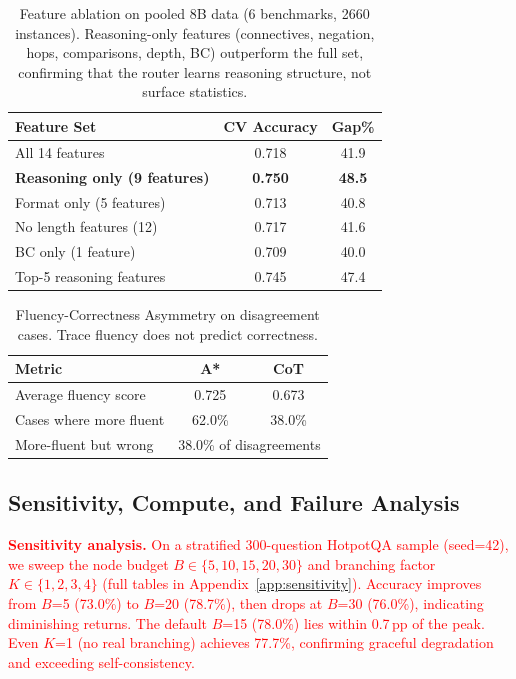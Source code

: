 \documentclass[11pt]{article}
\begin{document}
{\begin{table}[ht]
\centering
\small
\begin{tabular}{lcc}
\toprule
\textbf{Feature Set} & \textbf{CV Accuracy} & \textbf{Gap\%} \\
\midrule
All 14 features & 0.718 & 41.9 \\
\textbf{Reasoning only (9 features)} & \textbf{0.750} & \textbf{48.5} \\
Format only (5 features) & 0.713 & 40.8 \\
No length features (12) & 0.717 & 41.6 \\
BC only (1 feature) & 0.709 & 40.0 \\
Top-5 reasoning features & 0.745 & 47.4 \\
\bottomrule
\end{tabular}
\caption{Feature ablation on pooled 8B data (6 benchmarks, 2660 instances). Reasoning-only features (connectives, negation, hops, comparisons, depth, BC) outperform the full set, confirming that the router learns reasoning structure, not surface statistics.}
\label{tab:feature_ablation}
\end{table}

\begin{table}[t]
\centering
\small
\begin{tabular}{lcc}
\toprule
\textbf{Metric} & \textbf{A*} & \textbf{CoT} \\
\midrule
Average fluency score & 0.725 & 0.673 \\
Cases where more fluent & 62.0\% & 38.0\% \\
More-fluent but wrong & \multicolumn{2}{c}{38.0\% of disagreements} \\
\bottomrule
\end{tabular}
\caption{Fluency-Correctness Asymmetry on disagreement cases. Trace fluency does not predict correctness.}
\label{tab:fluency_asymmetry}
\end{table}

\subsection{Sensitivity, Compute, and Failure Analysis}
\label{sec:sensitivity}

\textcolor{red}{\textbf{Sensitivity analysis.}}
\textcolor{red}{On a stratified 300-question HotpotQA sample (seed=42), we sweep the node budget $B \in \{5,10,15,20,30\}$ and branching factor $K \in \{1,2,3,4\}$ (full tables in Appendix~\ref{app:sensitivity}). Accuracy improves from $B$=5 (73.0\%) to $B$=20 (78.7\%), then drops at $B$=30 (76.0\%), indicating diminishing returns. The default $B$=15 (78.0\%) lies within 0.7\,pp of the peak. Even $K$=1 (no real branching) achieves 77.7\%, confirming graceful degradation and exceeding self-consistency.}

}
\end{document}
